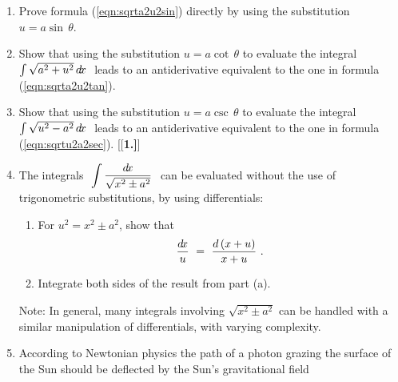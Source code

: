 {\begin{enumerate}[\bfseries 1.]
\begin{multicols}{4}
\end{multicols}
 \item Prove formula (\ref{eqn:sqrta2u2sin}) directly by using the substitution
  $u=a \sin\,\theta$.
 \item Show that using the substitution $u=a \cot\,\theta$ to evaluate the
  integral $\int \sqrt{a^2 + u^2}\,d\!x~$ leads to an antiderivative equivalent
  to the one in formula (\ref{eqn:sqrta2u2tan}).
 \item Show that using the substitution $u=a \csc\,\theta$ to evaluate the
  integral $\int \sqrt{u^2 - a^2}\,d\!x~$ leads to an antiderivative equivalent
  to the one in formula (\ref{eqn:sqrtu2a2sec}).
[{[\bfseries 1.]}]
 \item The integrals $~\displaystyle\int \frac{d\!x}{\sqrt{x^2 \pm a^2}}~$ can be
  evaluated without the use of trigonometric substitutions, by using
  differentials:
  \begin{enumerate}[\bfseries (a)]
   \item For $u^2 = x^2 \pm a^2$, show that
\[
\frac{d\!x}{u} ~=~ \frac{d\,(x+u)}{x+u} ~.
\]
   \item Integrate both sides of the result from part (a).
  \end{enumerate}
  Note: In general, many integrals involving $\sqrt{x^2 \pm a^2}$ can be handled
  with a similar manipulation of differentials, with varying complexity.
 \item According to Newtonian physics the path of a photon grazing
  the surface of the Sun should be deflected by the Sun's gravitational field

\end{enumerate}}
